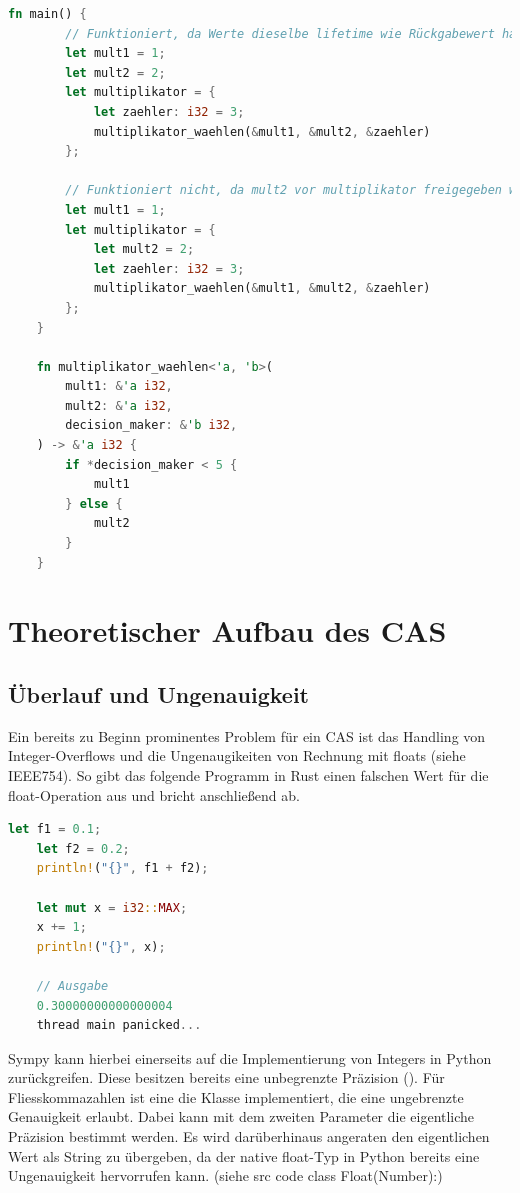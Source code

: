 \documentclass[11pt,a4paper, ngerman]{article}
\begin{document}
\begin{lstlisting}[language=rust, caption={lifetime Beispiele \cite{RustLifetimeEx}}]
    fn main() {
        // Funktioniert, da Werte dieselbe lifetime wie Rückgabewert haben
        let mult1 = 1;
        let mult2 = 2;
        let multiplikator = {
            let zaehler: i32 = 3;
            multiplikator_waehlen(&mult1, &mult2, &zaehler)
        };

        // Funktioniert nicht, da mult2 vor multiplikator freigegeben wird
        let mult1 = 1;
        let multiplikator = {
            let mult2 = 2;
            let zaehler: i32 = 3;
            multiplikator_waehlen(&mult1, &mult2, &zaehler)
        };
    }

    fn multiplikator_waehlen<'a, 'b>(
        mult1: &'a i32,
        mult2: &'a i32,
        decision_maker: &'b i32,
    ) -> &'a i32 {
        if *decision_maker < 5 {
            mult1
        } else {
            mult2
        }
    }
\end{lstlisting}

\newpage

\section{Theoretischer Aufbau des CAS}
\subsection{Überlauf und Ungenauigkeit}
Ein bereits zu Beginn prominentes Problem für ein CAS ist das Handling von Integer-Overflows und die Ungenaugikeiten von Rechnung mit floats (siehe IEEE754). So gibt das folgende Programm in Rust einen falschen Wert für die float-Operation aus und bricht anschließend ab.

\begin{lstlisting}[language=rust, caption={Überlauf und Ungenauigkeit}]
    let f1 = 0.1;
    let f2 = 0.2;
    println!("{}", f1 + f2);

    let mut x = i32::MAX;
    x += 1;
    println!("{}", x);

    // Ausgabe
    0.30000000000000004
    thread main panicked...
\end{lstlisting}

Sympy kann hierbei einerseits auf die Implementierung von Integers in Python zurückgreifen. Diese besitzen bereits eine unbegrenzte Präzision (\cite{PythonDocuIntPrecision}). Für Fliesskommazahlen ist eine die Klasse  implementiert, die eine ungebrenzte Genauigkeit erlaubt. Dabei kann mit dem zweiten Parameter die eigentliche Präzision bestimmt werden. Es wird darüberhinaus angeraten den eigentlichen Wert als String zu übergeben, da der native float-Typ in Python bereits eine Ungenauigkeit hervorrufen kann. (siehe src code class Float(Number):)
\end{document}
